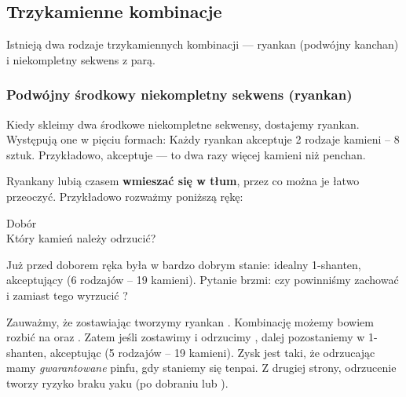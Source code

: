 \subsection{Trzykamienne kombinacje}
Istnieją dwa rodzaje trzykamiennych kombinacji --- {\jap ryankan} (podwójny {\jap kanchan}) i niekompletny sekwens z parą.

\vfill
\subsubsection{Podwójny środkowy niekompletny sekwens ({\jap ryankan})} \label{sec:ryankan}
Kiedy skleimy dwa środkowe niekompletne sekwensy, dostajemy {\jap ryankan}.
Występują one w pięciu formach:
{
}
Każdy {\jap ryankan} akceptuje 2 rodzaje kamieni -- 8 sztuk.
Przykładowo,  akceptuje  --- to dwa razy więcej kamieni niż {\jap penchan}.

\bigskip
{\jap Ryankan}y lubią czasem {\bf wmieszać się w tłum}, przez co można je łatwo przeoczyć.
Przykładowo rozważmy poniższą rękę:
\begin{screen}
	\vspace{-15pt}\hfill{\footnotesize{Dobór~~~~~~~~~}}\\
	\vspace{-2pt}Który kamień należy odrzucić?\vspace{-5pt}
\end{screen}
Już przed doborem  ręka była w bardzo dobrym stanie: idealny 1-{\jap shanten}, akceptujący  (6 rodzajów -- 19 kamieni).
Pytanie brzmi: czy powinniśmy zachować  i zamiast tego wyrzucić ?

\bigskip
Zauważmy, że zostawiając  tworzymy {\jap ryankan} .
Kombinację  możemy bowiem rozbić na  oraz .
Zatem jeśli zostawimy  i odrzucimy , dalej pozostaniemy w 1-{\jap shanten}, akceptując  (5 rodzajów -- 19 kamieni).
Zysk jest taki, że odrzucając  mamy \emph{gwarantowane} {\jap pinfu}, gdy staniemy się {\jap tenpai}.
Z drugiej strony, odrzucenie  tworzy ryzyko braku {\jap yaku} (po dobraniu  lub ).

